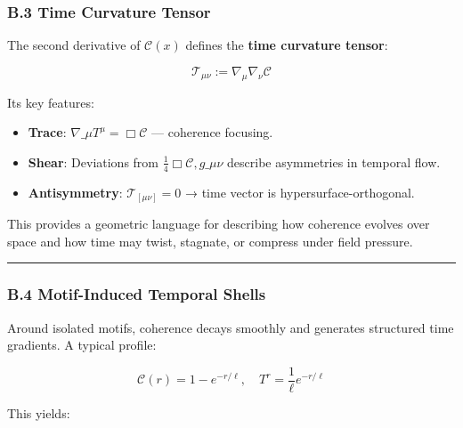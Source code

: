 \documentclass[
  11pt,
]{article}
\providecommand{\tightlist}{%
  \setlength{\itemsep}{0pt}\setlength{\parskip}{0pt}}
\begin{document}
\subsubsection{\texorpdfstring{\textbf{B.3 Time Curvature
Tensor}}{B.3 Time Curvature Tensor}}\label{b.3-time-curvature-tensor}

The second derivative of \(\mathcal{C}(x)\) defines the \textbf{time
curvature tensor}:

\[
\mathcal{T}_{\mu\nu} := \nabla_\mu \nabla_\nu \mathcal{C}
\]

Its key features:

\begin{itemize}
\tightlist
\item
  \textbf{Trace}: \(\nabla\_\mu T^\mu = \Box \mathcal{C}\) --- coherence
  focusing.
\item
  \textbf{Shear}: Deviations from
  \(\frac{1}{4}\Box \mathcal{C} , g\_{\mu\nu}\) describe asymmetries in
  temporal flow.
\item
  \textbf{Antisymmetry}: \(\mathcal{T}_{[\mu\nu]} = 0\) → time vector is
  hypersurface-orthogonal.
\end{itemize}

This provides a geometric language for describing how coherence evolves
over space and how time may twist, stagnate, or compress under field
pressure.

\begin{center}\rule{0.5\linewidth}{0.5pt}\end{center}

\subsubsection{\texorpdfstring{\textbf{B.4 Motif-Induced Temporal
Shells}}{B.4 Motif-Induced Temporal Shells}}\label{b.4-motif-induced-temporal-shells}

Around isolated motifs, coherence decays smoothly and generates
structured time gradients. A typical profile:

\[
\mathcal{C}(r) = 1 - e^{-r/\ell}, \quad T^r = \frac{1}{\ell} e^{-r/\ell}
\]

This yields:
\end{document}
